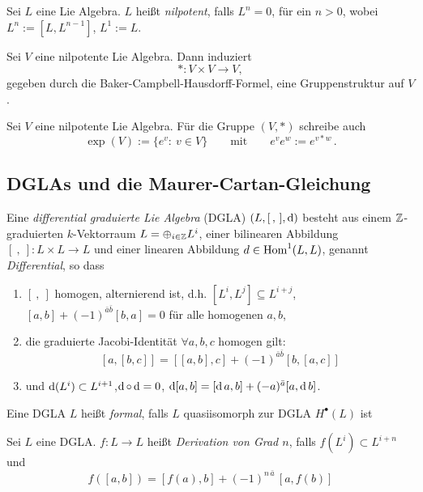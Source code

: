 \documentclass{vorlage}
\begin{document}
\begin{frame}[<+->]
  \begin{definition}
    Sei $L$ eine Lie Algebra. $L$ heißt \emph{nilpotent},
    falls $L^n = 0$, für ein $n > 0$,
    wobei $L^n := [L,L^{n-1}]$, $L^1 := L$.
  \end{definition}

  \begin{satz}
    Sei $V$ eine nilpotente Lie Algebra. Dann induziert
    \[ \ast: V \times V \to V, \]
    gegeben durch die Baker-Campbell-Hausdorff-Formel,
    eine Gruppenstruktur auf $V$.
  \end{satz}

  \begin{definition}
    Sei $V$ eine nilpotente Lie Algebra. Für die Gruppe $(V,\ast)$ schreibe
    auch
    \[ \exp(V) := \{ e^v:\ v\in V\} \qquad\text{mit}\qquad
      e^ve^w := e^{v\ast w}\,.\]
  \end{definition}
\end{frame}

\subsection{DGLAs und die Maurer-Cartan-Gleichung}

\begin{frame}[<+->]
  \begin{definition}[DGLA]
    Eine \emph{differential graduierte Lie Algebra} (DGLA) $(L,[\,,\,],\operatorname{d})$ 
    besteht aus einem $\mathbb Z$-graduierten $k$-Vektorraum $L = \oplus_{i\in\mathbb Z} L^i$,
    einer bilinearen Abbildung $[\ ,\ ]: L \times L \to L$ und einer linearen
    Abbildung $d \in \operatorname{Hom}^1(L,L)$, genannt \emph{Differential}, so dass
    \begin{enumerate}
      \item $[\ ,\ ]$ homogen, alternierend ist, d.h.
        $[L^i, L^j] \subseteq L^{i+j}$, $[a,b] + (-1)^{\bar a\bar b}[b,a]=0$
        für alle homogenen $a,b$,
      \item die graduierte Jacobi-Identität $\forall a,b,c$ homogen gilt:
        \[ [a,[b,c]] = [[a,b],c] + (-1)^{\bar a\bar b}[b,[a,c]] \]
      \item und $\operatorname{d}(L^i) \subset L^{i+1}$,\quad $\operatorname{d}\circ \operatorname{d} = 0$,\quad
        $\operatorname{d}[a,b] = [\operatorname{d} a,b] + (-a)^{\bar a} [a,\operatorname{d} b]$.
    \end{enumerate}
  \end{definition}
  \begin{definition}[formal]
    Eine DGLA $L$ heißt \emph{formal}, falls $L$ quasiisomorph zur DGLA
    $H^\bullet (L)$ ist
  \end{definition}
  \begin{definition}[Derivation]
    Sei $L$ eine DGLA. $f: L\to L$ heißt \emph{Derivation von Grad $n$}, falls
    $f(L^i) \subset L^{i+n}$ und 
    \[ f([a,b]) = [f(a),b] + (-1)^{n\,\bar a}\, [a,f(b)]\]
  \end{definition}
\end{frame}
\end{document}
